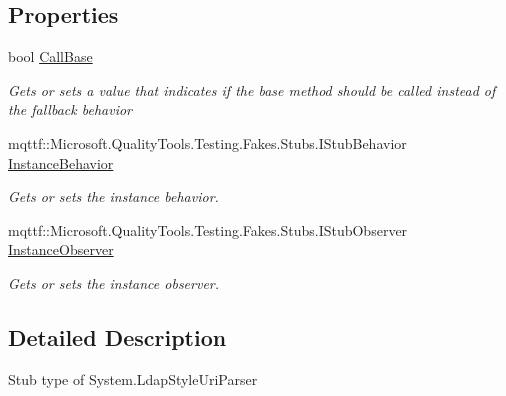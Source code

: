 \subsection*{Properties}
\begin{DoxyCompactItemize}
\item 
bool \hyperlink{class_system_1_1_fakes_1_1_stub_ldap_style_uri_parser_adab25010a542c34521f6cec03e16c3d5}{Call\-Base}
\begin{DoxyCompactList}\small\item\em Gets or sets a value that indicates if the base method should be called instead of the fallback behavior\end{DoxyCompactList}\item 
mqttf\-::\-Microsoft.\-Quality\-Tools.\-Testing.\-Fakes.\-Stubs.\-I\-Stub\-Behavior \hyperlink{class_system_1_1_fakes_1_1_stub_ldap_style_uri_parser_a7dd72dee12e64428378308d464a406a6}{Instance\-Behavior}
\begin{DoxyCompactList}\small\item\em Gets or sets the instance behavior.\end{DoxyCompactList}\item 
mqttf\-::\-Microsoft.\-Quality\-Tools.\-Testing.\-Fakes.\-Stubs.\-I\-Stub\-Observer \hyperlink{class_system_1_1_fakes_1_1_stub_ldap_style_uri_parser_a3b55435f597e90ef08b795e53cf701a2}{Instance\-Observer}
\begin{DoxyCompactList}\small\item\em Gets or sets the instance observer.\end{DoxyCompactList}\end{DoxyCompactItemize}


\subsection{Detailed Description}
Stub type of System.\-Ldap\-Style\-Uri\-Parser



